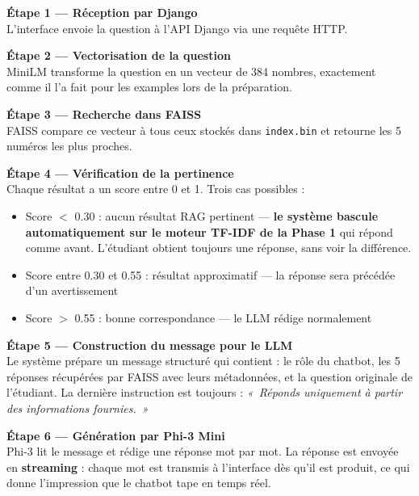 \documentclass[11pt,a4paper]{article}
\begin{document}
\begin{exemple}

\textbf{Étape 1 --- Réception par Django} \\
L'interface envoie la question à l'API Django via une requête HTTP.

\vspace{0.4cm}
\textbf{Étape 2 --- Vectorisation de la question} \\
MiniLM transforme la question en un vecteur de 384 nombres,
exactement comme il l'a fait pour les examples lors de la
préparation.

\vspace{0.4cm}
\textbf{Étape 3 --- Recherche dans FAISS} \\
FAISS compare ce vecteur à tous ceux stockés dans
\texttt{index.bin} et retourne les 5 numéros les plus proches.

\vspace{0.4cm}
\textbf{Étape 4 --- Vérification de la pertinence} \\
Chaque résultat a un score entre 0 et 1. Trois cas possibles :
\begin{itemize}
    \item Score $<$ 0.30 : aucun résultat RAG pertinent ---
    \textbf{le système bascule automatiquement sur le moteur
    TF-IDF de la Phase 1} qui répond comme avant.
    L'étudiant obtient toujours une réponse, sans voir
    la différence.
    \item Score entre 0.30 et 0.55 : résultat approximatif ---
    la réponse sera précédée d'un avertissement
    \item Score $>$ 0.55 : bonne correspondance --- le LLM rédige
    normalement
\end{itemize}

\vspace{0.4cm}
\textbf{Étape 5 --- Construction du message pour le LLM} \\
Le système prépare un message structuré qui contient :
le rôle du chatbot, les 5 réponses récupérées par FAISS
avec leurs métadonnées, et la question originale de l'étudiant.
La dernière instruction est toujours : \textit{«~Réponds
uniquement à partir des informations fournies.~»}

\vspace{0.4cm}
\textbf{Étape 6 --- Génération par Phi-3 Mini} \\
Phi-3 lit le message et rédige une réponse mot par mot.
La réponse est envoyée en \textbf{streaming} : chaque mot
est transmis à l'interface dès qu'il est produit, ce qui
donne l'impression que le chatbot tape en temps réel.


\end{exemple}
\end{document}
